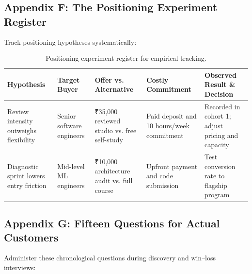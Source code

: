 \subsection*{Appendix F: The Positioning Experiment Register}

Track positioning hypotheses systematically:

\begin{table}[t]
\centering
\small
\begin{tabularx}{\textwidth}{>{\raggedright\arraybackslash}p{2.5cm} >{\raggedright\arraybackslash}X >{\raggedright\arraybackslash}X >{\raggedright\arraybackslash}p{3cm} >{\raggedright\arraybackslash}X}
\toprule
\textbf{Hypothesis} & \textbf{Target Buyer} & \textbf{Offer vs. Alternative} & \textbf{Costly Commitment} & \textbf{Observed Result \& Decision} \\
\midrule
Review intensity outweighs flexibility & Senior software engineers & ₹35,000 reviewed studio vs. free self-study & Paid deposit and 10 hours/week commitment & Recorded in cohort 1; adjust pricing and capacity \\
Diagnostic sprint lowers entry friction & Mid-level ML engineers & ₹10,000 architecture audit vs. full course & Upfront payment and code submission & Test conversion rate to flagship program \\
\bottomrule
\end{tabularx}
\caption{Positioning experiment register for empirical tracking.}
\label{tab:ch8-app-experiment-register}
\end{table}

\subsection*{Appendix G: Fifteen Questions for Actual Customers}

Administer these chronological questions during discovery and win--loss interviews:

